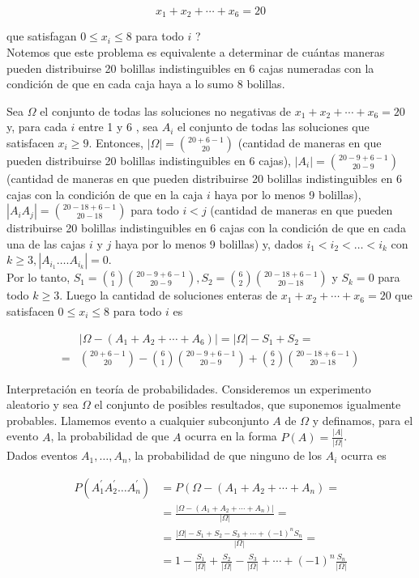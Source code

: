 \documentclass[10pt]{article}
\begin{document}
$$
x_{1}+x_{2}+\cdots+x_{6}=20
$$

que satisfagan $0 \leq x_{i} \leq 8$ para todo $i$ ?\\
Notemos que este problema es equivalente a determinar de cuántas maneras pueden distribuirse 20 bolillas indistinguibles en 6 cajas numeradas con la condición de que en cada caja haya a lo sumo 8 bolillas.

Sea $\Omega$ el conjunto de todas las soluciones no negativas de $x_{1}+x_{2}+\cdots+x_{6}=20$ y, para cada $i$ entre 1 y 6 , sea $A_{i}$ el conjunto de todas las soluciones que satisfacen $x_{i} \geq 9$. Entonces, $|\Omega|=\binom{20+6-1}{20}$ (cantidad de maneras en que pueden distribuirse 20 bolillas indistinguibles en 6 cajas), $\left|A_{i}\right|=\binom{20-9+6-1}{20-9}$ (cantidad de maneras en que pueden distribuirse 20 bolillas indistinguibles en 6 cajas con la condición de que en la caja $i$ haya por lo menos 9 bolillas), $\left|A_{i} A_{j}\right|=\binom{20-18+6-1}{20-18}$ para todo $i<j$ (cantidad de maneras en que pueden distribuirse 20 bolillas indistinguibles en 6 cajas con la condición de que en cada una de las cajas $i$ y $j$ haya por lo menos 9 bolillas) y, dados $i_{1}<i_{2}<\ldots<i_{k}$ con $k \geq 3,\left|A_{i_{1}} \ldots . A_{i_{k}}\right|=0$.\\
Por lo tanto, $S_{1}=\binom{6}{1}\binom{20-9+6-1}{20-9}, S_{2}=\binom{6}{2}\binom{20-18+6-1}{20-18}$ y $S_{k}=0$ para todo $k \geq 3$. Luego la cantidad de soluciones enteras de $x_{1}+x_{2}+\cdots+x_{6}=20$ que satisfacen $0 \leq x_{i} \leq 8$ para todo $i$ es

$$
\begin{aligned}
& \left|\Omega-\left(A_{1}+A_{2}+\cdots+A_{6}\right)\right|=|\Omega|-S_{1}+S_{2}= \\
= & \binom{20+6-1}{20}-\binom{6}{1}\binom{20-9+6-1}{20-9}+\binom{6}{2}\binom{20-18+6-1}{20-18}
\end{aligned}
$$

Interpretación en teoría de probabilidades. Consideremos un experimento aleatorio y sea $\Omega$ el conjunto de posibles resultados, que suponemos igualmente probables. Llamemos evento a cualquier subconjunto $A$ de $\Omega$ y definamos, para el evento $A$, la probabilidad de que $A$ ocurra en la forma $P(A)=\frac{|A|}{|\Omega|}$.\\
Dados eventos $A_{1}, \ldots, A_{n}$, la probabilidad de que ninguno de los $A_{i}$ ocurra es

$$
\begin{aligned}
P\left(A_{1}^{\prime} A_{2}^{\prime} \ldots A_{n}^{\prime}\right) & =P\left(\Omega-\left(A_{1}+A_{2}+\cdots+A_{n}\right)=\right. \\
& =\frac{\left|\Omega-\left(A_{1}+A_{2}+\cdots+A_{n}\right)\right|}{|\Omega|}= \\
& =\frac{|\Omega|-S_{1}+S_{2}-S_{3}+\cdots+(-1)^{n} S_{n}}{|\Omega|}= \\
& =1-\frac{S_{1}}{|\Omega|}+\frac{S_{2}}{|\Omega|}-\frac{S_{3}}{|\Omega|}+\cdots+(-1)^{n} \frac{S_{n}}{|\Omega|}
\end{aligned}
$$
\end{document}
